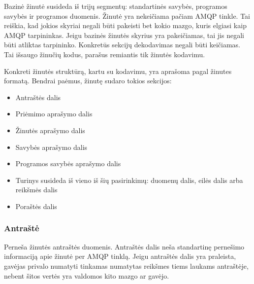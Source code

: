 \documentclass[12pt, a4paper, lithuanian]{article}
\begin{document}
    Bazinė žinutė susideda iš trijų segmentų: standartinės savybės, programos savybės ir programos duomenis.
    Žinutė yra nekeičiama pačiam AMQP tinkle.
    Tai reiškia, kad jokios skyriai negali būti pakeisti bet kokio mazgo, kuris elgiasi kaip AMQP tarpininkas.
    Jeigu bazinės žinutės skyrius yra pakeičiamas, tai jis negali būti atliktas tarpininko.
    Konkretūs sekcijų dekodavimas negali būti keičiamas.
    Tai išsaugo žinučių kodus, parašus remiantis tik žinutės kodavimu.

    Konkreti žinutės struktūrą, kartu su kodavimu, yra aprašoma pagal žinutes formatą. Bendrai paėmus, žinutę sudaro tokios sekcijos:

    \begin{itemize}
        \item Antraštės dalis
        \item Priėmimo aprašymo dalis
        \item Žinutės aprašymo dalis
        \item Savybės aprašymo dalis
        \item Programos savybės aprašymo dalis
        \item Turinys susideda iš vieno iš šių pasirinkimų: duomenų dalis, eilės dalis arba reikšmės dalis
        \item Poraštės dalis
    \end{itemize}

    \subsubsection{Antraštė}

        Perneša žinutės antraštės duomenis. 
        Antraštės dalis neša standartinę pernešimo informaciją apie žinutė per AMQP tinklą.
        Jeigu antraštės dalis yra praleista, gavėjas privalo numatyti tinkamas numatytas reikšmes tiems laukams antraštėje, nebent šitos vertės yra valdomos kito mazgo ar gavėjo.
\end{document}
